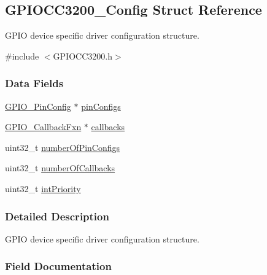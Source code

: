 \subsection{G\+P\+I\+O\+C\+C3200\+\_\+\+Config Struct Reference}
\label{struct_g_p_i_o_c_c3200___config}


G\+P\+I\+O device specific driver configuration structure.  




{\ttfamily \#include $<$G\+P\+I\+O\+C\+C3200.\+h$>$}

\subsubsection*{Data Fields}
\begin{DoxyCompactItemize}
\item 
\hyperlink{_g_p_i_o_8h_a7f5d979226db633309b3fdc0f4a8aef6}{G\+P\+I\+O\+\_\+\+Pin\+Config} $\ast$ \hyperlink{struct_g_p_i_o_c_c3200___config_abc7b66da3c0a6ec46b16c2571d10a3d4}{pin\+Configs}
\item 
\hyperlink{_g_p_i_o_8h_a033bc79f1a530381da2b74711e6b8971}{G\+P\+I\+O\+\_\+\+Callback\+Fxn} $\ast$ \hyperlink{struct_g_p_i_o_c_c3200___config_a3878a82f69dac0672b41656f93177715}{callbacks}
\item 
uint32\+\_\+t \hyperlink{struct_g_p_i_o_c_c3200___config_aeb8538c98edc819489974c5a97530feb}{number\+Of\+Pin\+Configs}
\item 
uint32\+\_\+t \hyperlink{struct_g_p_i_o_c_c3200___config_aaa30e1f80e716b304beb4a51729f105c}{number\+Of\+Callbacks}
\item 
uint32\+\_\+t \hyperlink{struct_g_p_i_o_c_c3200___config_a75035e2fbbae7a387c9af597c26b2d77}{int\+Priority}
\end{DoxyCompactItemize}


\subsubsection{Detailed Description}
G\+P\+I\+O device specific driver configuration structure. 

\subsubsection{Field Documentation}
